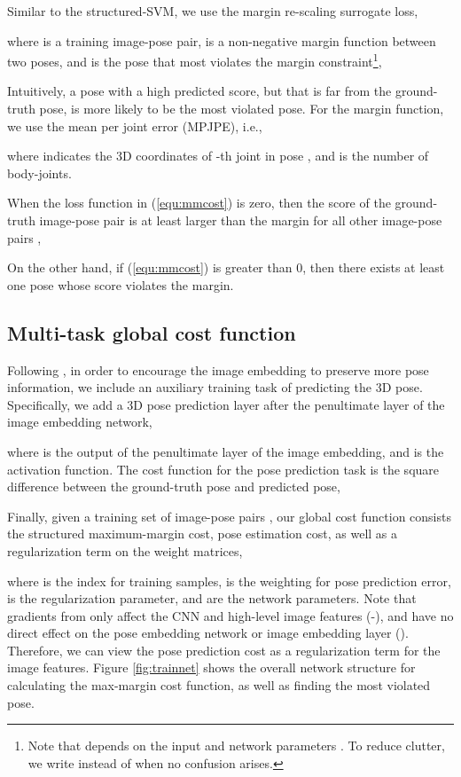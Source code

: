 \documentclass[10pt,twocolumn,letterpaper]{article}
\newcommand{\refeqn}[1]{(\ref{#1})}
\begin{document}
Similar to the structured-SVM, 
we use the margin re-scaling surrogate loss,

where  is a training image-pose pair, 
 is a non-negative margin function between two poses, and
 is the pose that most violates the margin constraint\footnote{Note that  depends on the input  and network parameters . To reduce clutter, we write  instead of  when no confusion arises.},


 Intuitively, a pose with a high predicted score, but that is far from the ground-truth pose, is more likely to be the most violated pose. 
For the margin function, we use the mean per joint error (MPJPE), i.e., 

where  indicates the 3D coordinates of -th joint in pose , and  is the number of body-joints. 

When the loss function in \refeqn{equ:mmcost} is zero, then the score of the ground-truth image-pose pair  is at least larger than the margin for all other image-pose pairs , 
	
On the other hand, if  \refeqn{equ:mmcost} is greater than 0, 
then there exists at least one pose  whose score  violates the margin. 


\subsection{Multi-task global cost function}
\vspace{-0.05in}
Following \cite{accv2014, hmlpeijcv},  in order to encourage the image embedding to preserve more pose information, we include an auxiliary training task of predicting the 3D pose.
Specifically, we add a 3D pose prediction layer after the penultimate layer of the image embedding network,

where  is the output of the penultimate layer of the image embedding, and  is the  activation function.
The cost function for the pose prediction task is the square difference between the ground-truth pose and predicted pose, 

Finally, given a training set of image-pose pairs ,  our global cost function consists the structured maximum-margin cost,  pose estimation cost, as well as a regularization term on the weight matrices,
 
where  is the index for training samples,   is the weighting for pose prediction error,  is the regularization parameter, and  are the network parameters.
Note that gradients from  only affect the CNN and high-level image features (-), and have no direct effect on the pose embedding network or image embedding layer (). Therefore, we can view the pose prediction cost as a regularization term for the image features.
Figure \ref{fig:trainnet} shows the overall network structure for calculating the max-margin cost function, as well as finding the most violated pose.
\end{document}
